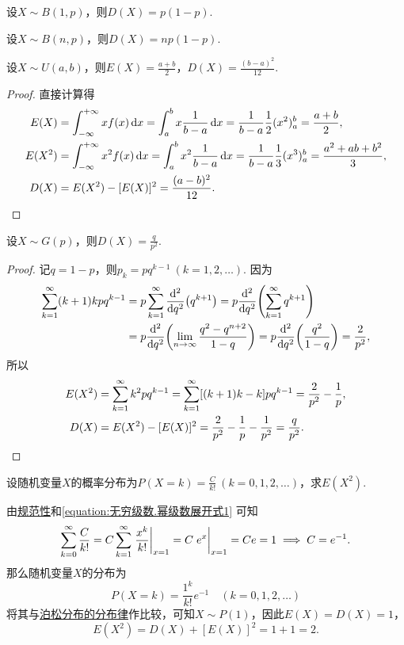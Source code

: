\begin{theorem}
设\(X \sim B(1,p)\)，则\(D(X) = p(1-p)\).
\end{theorem}

\begin{theorem}
设\(X \sim B(n,p)\)，则\(D(X) = np(1-p)\).
\end{theorem}

\begin{theorem}
设\(X \sim U(a,b)\)，则\(E(X) = \frac{a+b}{2}\)，\(D(X) = \frac{(b-a)^2}{12}\).
\begin{proof}
直接计算得
\begin{align*}
E(X) &= \int_{-\infty}^{+\infty} x f(x) \dd{x}
= \int_a^b x \frac{1}{b-a} \dd{x}
= \frac{1}{b-a} \frac{1}{2} (x^2)_a^b
= \frac{a+b}{2}, \\
E(X^2) &= \int_{-\infty}^{+\infty} x^2 f(x) \dd{x}
= \int_a^b x^2 \frac{1}{b-a} \dd{x}
= \frac{1}{b-a} \frac{1}{3} (x^3)_a^b
= \frac{a^2+ab+b^2}{3}, \\
D(X) &= E(X^2) - [E(X)]^2
= \frac{(a-b)^2}{12}.
\qedhere
\end{align*}
\end{proof}
\end{theorem}

\begin{theorem}\label{theorem:随机变量的数字特征.几何分布的方差}
设\(X \sim G(p)\)，则\(D(X) = \frac{q}{p^2}\).
\begin{proof}
\def\s{\sum\limits_{k=1}^\infty }%
\def\l{\lim\limits_{n\to\infty}}%
记\(q = 1-p\)，则\(p_k = pq^{k-1}\ (k=1,2,\dotsc)\).
因为\begin{align*}
\s (k+1)kpq^{k-1}
&= p \s \dv[2]{q}(q^{k+1})
= p \dv[2]{q}(\s q^{k+1}) \\
&= p \dv[2]{q}(\l \frac{q^2-q^{n+2}}{1-q})
= p \dv[2]{q}(\frac{q^2}{1-q})
= \frac{2}{p^2}, \\
\end{align*}所以\begin{align*}
E(X^2) &= \s k^2 pq^{k-1}
= \s [(k+1)k-k] pq^{k-1}
= \frac{2}{p^2} - \frac{1}{p}, \\
D(X) &= E(X^2) - [E(X)]^2
= \frac{2}{p^2} - \frac{1}{p} - \frac{1}{p^2}
= \frac{q}{p^2}.
\qedhere
\end{align*}
\end{proof}
\end{theorem}

\begin{example}
设随机变量\(X\)的概率分布为\(P(X=k) = \frac{C}{k!}\ (k=0,1,2,\dotsc)\)，求\(E(X^2)\).
\begin{solution}
由\hyperref[theorem:随机变量及其分布.离散型随机变量的密度函数的性质]{规范性}和\cref{equation:无穷级数.幂级数展开式1} 可知\[
\sum\limits_{k=0}^\infty \frac{C}{k!}
= C \sum\limits_{k=1}^\infty \eval{\frac{x^k}{k!}}_{x=1}
= C \eval{e^x}_{x=1}
= C e = 1
\implies
C = e^{-1}.
\]那么随机变量\(X\)的分布为\[
P(X=k) = \frac{1^k}{k!} e^{-1} \quad(k=0,1,2,\dotsc)
\]将其与\hyperref[equation:随机变量及其分布.泊松分布的分布律]{泊松分布的分布律}作比较，可知\(X \sim P(1)\)，因此\(E(X) = D(X) = 1\)，\[
E(X^2) = D(X) + [E(X)]^2 = 1 + 1 = 2.
\]
\end{solution}
\end{example}

